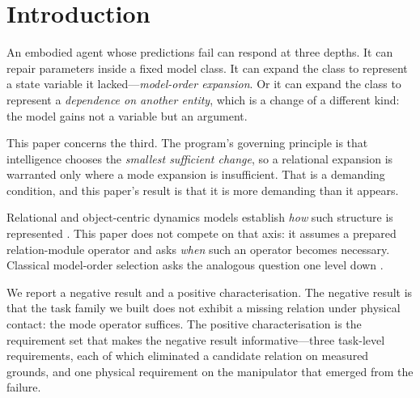 \documentclass[10pt]{article}
\begin{document}
\begin{abstract}
The contribution is the requirement set, the measurement that each candidate
fails, and a physical criterion recovered by sweeping the carrier's settling time
under injected coupling: the mode operator returns once settling reaches the
carrier's duty-cycle period, 0.133 to 0.917 across that threshold. The same sweep
refutes the tidier account we started with---the relational arm does \emph{not}
collapse under a smoothed carrier, so settling explains the mode operator's
return and not the relational arm's physical failure, which remains open.

\textbf{Keywords:} world models, structural adaptation, relational models,
negative results, preregistration, embodied control, surgical simulation
\end{abstract}

\section{Introduction}

An embodied agent whose predictions fail can respond at three depths. It can
repair parameters inside a fixed model class. It can expand the class to
represent a state variable it lacked---\emph{model-order expansion}. Or it can
expand the class to represent a \emph{dependence on another entity}, which is a
change of a different kind: the model gains not a variable but an argument.

This paper concerns the third. The program's governing principle is that
intelligence chooses the \emph{smallest sufficient change}, so a relational
expansion is warranted only where a mode expansion is insufficient. That is a
demanding condition, and this paper's result is that it is more demanding than it
appears.

Relational and object-centric dynamics models establish \emph{how} such structure
is represented \citep{battaglia2016interaction,kipf2018nri,kipf2020cswm}. This
paper does not compete on that axis: it assumes a prepared relation-module
operator and asks \emph{when} such an operator becomes necessary. Classical
model-order selection asks the analogous question one level down
\citep{ljung1999system}.

We report a negative result and a positive characterisation. The negative result
is that the task family we built does not exhibit a missing relation under
physical contact: the mode operator suffices. The positive characterisation is
the requirement set that makes the negative result informative---three task-level
requirements, each of which eliminated a candidate relation on measured grounds,
and one physical requirement on the manipulator that emerged from the failure.
\end{document}
